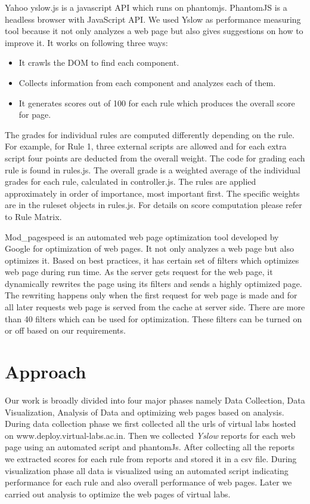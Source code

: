 \documentclass[conference]{IEEEtran}
\begin{document}
Yahoo yslow.js is a javascript API which runs on phantomjs. PhantomJS is a
headless browser with JavaScript API\cite{pjs}. We used Yslow as performance measuring
tool because it not only analyzes a web page but also gives suggestions on how to
improve it. It works on following three ways:
\begin{itemize}
\item It crawls the DOM to find each component.
\item Collects information from each component and analyzes each of them.
\item It generates scores out of 100 for each rule which produces the overall
score for page.
\end{itemize}
The grades for individual rules are computed differently depending on the rule.
For example, for Rule 1, three external scripts are allowed and for each extra script
four points are deducted from the overall weight. The code for grading each
rule is found in rules.js. The overall grade is a weighted average of the
individual grades for each rule, calculated in controller.js. The rules are applied
approximately in order of importance, most important first. The specific weights
are in the ruleset objects in rules.js. For details on score computation please refer to Rule Matrix\cite{rulematrix}.

Mod\_pagespeed\cite{google:mod-pagespeed} is an automated web page optimization tool developed by Google for
optimization of web pages. It not only
analyzes a web page but also optimizes it. Based on best practices, it has
certain set of filters which optimizes web page during run time. As the server
gets request for the web page, it dynamically rewrites the page using its filters\cite{pagespeed:filters}
and sends a highly optimized page. The rewriting happens only when the first
request for web page is made and for all later requests web page is served from the cache
at server side. There are more than 40 filters which can be used for
optimization. These filters can be turned on or off based on our requirements. 
% 
% 
\section{Approach}\label{sec-4}
Our work is broadly divided into four major phases namely Data Collection, Data
Visualization, Analysis of Data and optimizing web pages based on analysis.
During data collection phase we first collected all the urls of virtual labs
hosted on www.deploy.virtual-labs.ac.in. Then we collected {\it Yslow} reports for each web page
using an automated script and phantomJs. After collecting all the reports we
extracted scores for each rule from reports and stored it in a csv file. During
visualization phase all data is visualized using an automated script indicating
performance for each rule and also overall performance of web pages. Later we
carried out analysis to optimize the web pages of virtual labs.
\end{document}
